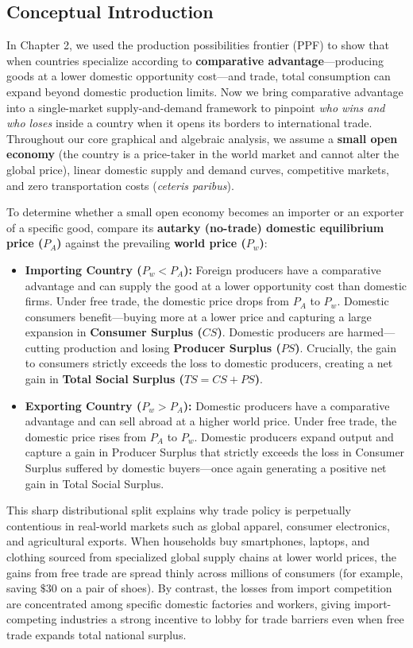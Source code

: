 \documentclass[11pt,letterpaper]{article}
\begin{document}
\subsection*{Conceptual Introduction}
In Chapter 2, we used the production possibilities frontier (PPF) to show that when countries specialize according to \textbf{comparative advantage}---producing goods at a lower domestic opportunity cost---and trade, total consumption can expand beyond domestic production limits. Now we bring comparative advantage into a single-market supply-and-demand framework to pinpoint \emph{who wins and who loses} inside a country when it opens its borders to international trade. Throughout our core graphical and algebraic analysis, we assume a \textbf{small open economy} (the country is a price-taker in the world market and cannot alter the global price), linear domestic supply and demand curves, competitive markets, and zero transportation costs (\emph{ceteris paribus}).

To determine whether a small open economy becomes an importer or an exporter of a specific good, compare its \textbf{autarky (no-trade) domestic equilibrium price ($P_A$)} against the prevailing \textbf{world price ($P_w$)}:
\begin{itemize}
    \item \textbf{Importing Country ($P_w < P_A$):} Foreign producers have a comparative advantage and can supply the good at a lower opportunity cost than domestic firms. Under free trade, the domestic price drops from $P_A$ to $P_w$. Domestic consumers benefit---buying more at a lower price and capturing a large expansion in \textbf{Consumer Surplus ($CS$)}. Domestic producers are harmed---cutting production and losing \textbf{Producer Surplus ($PS$)}. Crucially, the gain to consumers strictly exceeds the loss to domestic producers, creating a net gain in \textbf{Total Social Surplus ($TS = CS + PS$)}.
    \item \textbf{Exporting Country ($P_w > P_A$):} Domestic producers have a comparative advantage and can sell abroad at a higher world price. Under free trade, the domestic price rises from $P_A$ to $P_w$. Domestic producers expand output and capture a gain in Producer Surplus that strictly exceeds the loss in Consumer Surplus suffered by domestic buyers---once again generating a positive net gain in Total Social Surplus.
\end{itemize}

This sharp distributional split explains why trade policy is perpetually contentious in real-world markets such as global apparel, consumer electronics, and agricultural exports. When households buy smartphones, laptops, and clothing sourced from specialized global supply chains at lower world prices, the gains from free trade are spread thinly across millions of consumers (for example, saving $\$30$ on a pair of shoes). By contrast, the losses from import competition are concentrated among specific domestic factories and workers, giving import-competing industries a strong incentive to lobby for trade barriers even when free trade expands total national surplus.
\end{document}
